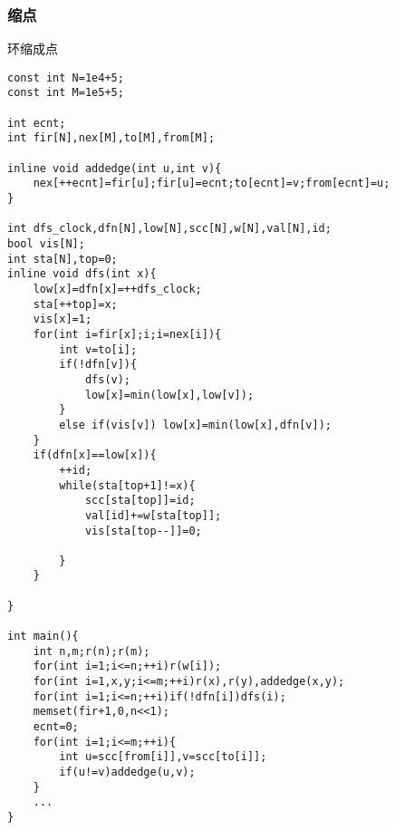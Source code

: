 \documentclass{ctexart}
\begin{document}
\subsubsection{缩点}
环缩成点
\begin{lstlisting}
const int N=1e4+5;
const int M=1e5+5;

int ecnt;
int fir[N],nex[M],to[M],from[M];

inline void addedge(int u,int v){
    nex[++ecnt]=fir[u];fir[u]=ecnt;to[ecnt]=v;from[ecnt]=u;
}

int dfs_clock,dfn[N],low[N],scc[N],w[N],val[N],id;
bool vis[N];
int sta[N],top=0;
inline void dfs(int x){
    low[x]=dfn[x]=++dfs_clock;
    sta[++top]=x;
    vis[x]=1;
    for(int i=fir[x];i;i=nex[i]){
        int v=to[i];
        if(!dfn[v]){
            dfs(v);
            low[x]=min(low[x],low[v]);
        }
        else if(vis[v]) low[x]=min(low[x],dfn[v]);
    }
    if(dfn[x]==low[x]){
        ++id;
        while(sta[top+1]!=x){
            scc[sta[top]]=id;
            val[id]+=w[sta[top]];
            vis[sta[top--]]=0;
            
        }
    }
    
}
    
int main(){
    int n,m;r(n);r(m);
    for(int i=1;i<=n;++i)r(w[i]);
    for(int i=1,x,y;i<=m;++i)r(x),r(y),addedge(x,y);
    for(int i=1;i<=n;++i)if(!dfn[i])dfs(i);
    memset(fir+1,0,n<<1);
    ecnt=0;
    for(int i=1;i<=m;++i){
        int u=scc[from[i]],v=scc[to[i]];
        if(u!=v)addedge(u,v);
    }
    ...
}
\end{lstlisting}
\end{document}
